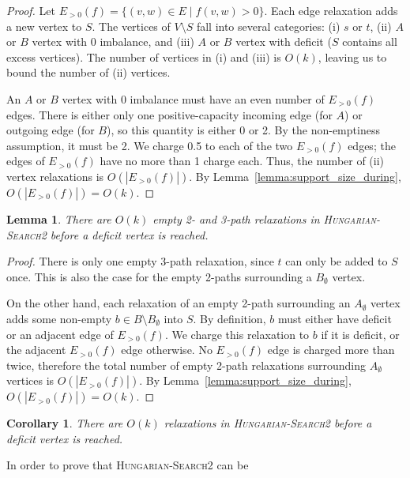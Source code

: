\documentclass[11pt]{article}
\theoremstyle{plain}
\newtheorem{lemma}{Lemma}
\newtheorem{corollary}{Corollary}
\begin{document}
\begin{proof}
Let $E_{>0}(f) = \{(v, w) \in E \mid f(v, w) > 0\}$.
Each edge relaxation adds a new vertex to $S$.
The vertices of $V \setminus S$ fall into several categories:
(i) $s$ or $t$, (ii) $A$ or $B$ vertex with 0 imbalance, and (iii) $A$ or $B$
vertex with deficit ($S$ contains all excess vertices).
The number of vertices in (i) and (iii) is $O(k)$, leaving us to bound the
number of (ii) vertices.

An $A$ or $B$ vertex with 0 imbalance must have an even number of $E_{>0}(f)$
edges.
There is either only one positive-capacity incoming edge (for $A$) or outgoing
edge (for $B$), so this quantity is either 0 or 2.
By the non-emptiness assumption, it must be 2.
We charge 0.5 to each of the two $E_{>0}(f)$ edges; the edges of $E_{>0}(f)$
have no more than 1 charge each.
Thus, the number of (ii) vertex relaxations is $O(|E_{>0}(f)|)$.
By Lemma~\ref{lemma:support_size_during}, $O(|E_{>0}(f)|) = O(k)$.
\end{proof}

\begin{lemma}
\label{lemma:goldberg_hs_length2}
There are $O(k)$ empty 2- and 3-path relaxations in \textsc{Hungarian-Search2}
before a deficit vertex is reached.
\end{lemma}

\begin{proof}
There is only one empty 3-path relaxation, since $t$ can only be added to $S$
once.
This is also the case for the empty 2-paths surrounding a $B_\emptyset$ vertex.

On the other hand, each relaxation of an empty 2-path surrounding an
$A_\emptyset$ vertex adds some non-empty $b \in B \setminus B_\emptyset$ into
$S$.
By definition, $b$ must either have deficit or an adjacent edge of $E_{>0}(f)$.
We charge this relaxation to $b$ if it is deficit, or the adjacent $E_{>0}(f)$
edge otherwise.
No $E_{>0}(f)$ edge is charged more than twice, therefore the total number of
empty 2-path relaxations surrounding $A_\emptyset$ vertices is
$O(|E_{>0}(f)|)$.
By Lemma~\ref{lemma:support_size_during}, $O(|E_{>0}(f)|) = O(k)$.
\end{proof}

\begin{corollary}
\label{corollary:goldberg_hs_length}
There are $O(k)$ relaxations in \textsc{Hungarian-Search2} before a deficit 
vertex is reached.
\end{corollary}

In order to prove that \textsc{Hungarian-Search2} can be 
\end{document}
